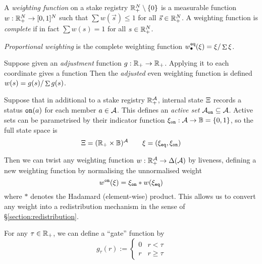 \begin{definition}

  A \emph{weighting function} on a stake registry $\mathbb{R}_+^N\setminus\{0\}$ is a measurable function $w:\mathbb{R}_+^N\rightarrow[0,1]^N$ such that $\sum w(\vec{s}) \leq 1$ for all $\vec{s}\in \mathbb{R}_+^N$.
  A weighting function is \emph{complete} if in fact $\sum w(s) = 1$ for all $s\in \mathbb{R}_+^N$.

\end{definition}

\begin{example}

  \emph{Proportional weighting} is the complete weighting function $w_\bullet^{\mathtt{eq}}(\xi) = \xi/\mathop{\Sigma} \xi$.

\end{example}


\begin{example}

  Suppose given an \emph{adjustment} function $g:\mathbb{R}_+\rightarrow\mathbb{R}_+$. 
  Applying it to each coordinate gives a function
  Then the \emph{adjusted} even weighting function is defined $w(s) = g(s)/\mathop{\Sigma} g(s)$.

\end{example}

\begin{example}

  Suppose that in additional to a stake registry $\mathbb{R}_+^{\mathcal{A}}$, internal state $\Xi$ records a status $\mathtt{on}(a)$ for each member $a\in\mathcal{A}$.
  This defines an \emph{active set} $\mathcal{A}_{\mathtt{on}}\subseteq\mathcal{A}$.
  Active sets can be parametrised by their indicator function $\xi_{\mathtt{on}}:\mathcal{A}\rightarrow\mathbb{B} = \{0,1\}$, so the full state space is
  \[
    \Xi = (\mathbb{R}_+\times\mathbb{B})^{\mathcal{A}} \qquad \xi = (\xi_{\mathtt{eq}},\xi_{\mathtt{on}})
  \]

  Then we can twist any weighting function $w:\mathbb{R}_+^{\mathcal{A}}\rightarrow \Delta(\mathcal{A})$ by liveness, defining a new weighting function by normalising the unnormalised weight
  \[
    w^{\mathtt{on}} (\xi) = \xi_{\mathtt{on}} * w(\xi_{\mathtt{eq}})
  \]
  where $*$ denotes the Hadamard (element-wise) product.
  This allows us to convert any weight into a redistribution mechanism in the sense of \S\ref{section:redistribution}.

\end{example}

\begin{example}
  For any $\tau\in\mathbb{R}_+$, we can define a ``gate'' function by
  \[
    g_\tau(r) := \left\{\begin{array}{ll} 0 & r<\tau \\ r & r\geq\tau\end{array}\right.
  \]
\end{example}

